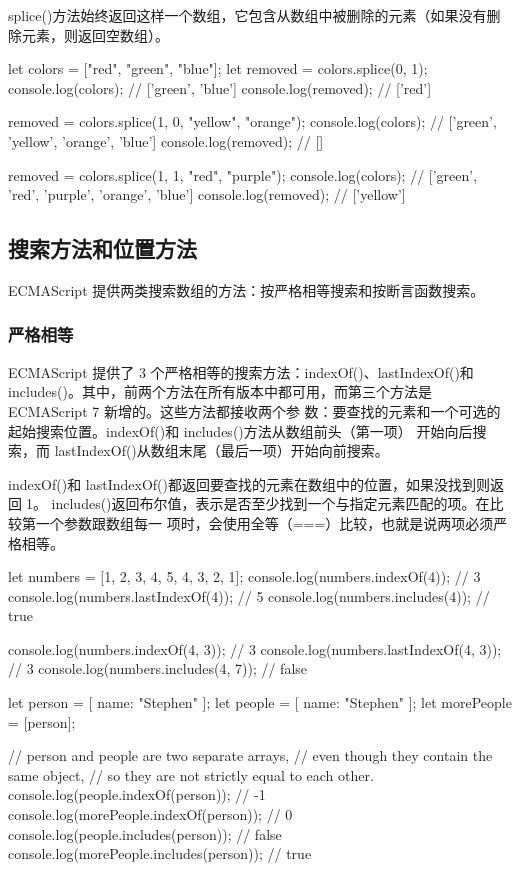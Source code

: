 splice()方法始终返回这样一个数组，它包含从数组中被删除的元素（如果没有删除元素，则返回空数组）。

\begin{js}
    let colors = ["red", "green", "blue"];
    let removed = colors.splice(0, 1);
    console.log(colors); // ['green', 'blue']
    console.log(removed); // ['red']

    removed = colors.splice(1, 0, "yellow", "orange");
    console.log(colors); // ['green', 'yellow', 'orange', 'blue']
    console.log(removed); // []

    removed = colors.splice(1, 1, "red", "purple");
    console.log(colors); // ['green', 'red', 'purple', 'orange', 'blue']
    console.log(removed); // ['yellow']
\end{js}

\subsection{搜索方法和位置方法}
ECMAScript 提供两类搜索数组的方法：按严格相等搜索和按断言函数搜索。
\subsubsection{严格相等}
ECMAScript 提供了 3 个严格相等的搜索方法：indexOf()、lastIndexOf()和 includes()。其中，前两个方法在所有版本中都可用，而第三个方法是 ECMAScript 7 新增的。这些方法都接收两个参
数：要查找的元素和一个可选的起始搜索位置。indexOf()和 includes()方法从数组前头（第一项）
开始向后搜索，而 lastIndexOf()从数组末尾（最后一项）开始向前搜索。

indexOf()和 lastIndexOf()都返回要查找的元素在数组中的位置，如果没找到则返回1。
includes()返回布尔值，表示是否至少找到一个与指定元素匹配的项。在比较第一个参数跟数组每一
项时，会使用全等（===）比较，也就是说两项必须严格相等。

\begin{js}
    let numbers = [1, 2, 3, 4, 5, 4, 3, 2, 1];
    console.log(numbers.indexOf(4)); // 3
    console.log(numbers.lastIndexOf(4)); // 5
    console.log(numbers.includes(4)); // true

    console.log(numbers.indexOf(4, 3)); // 3
    console.log(numbers.lastIndexOf(4, 3)); // 3
    console.log(numbers.includes(4, 7)); // false

    let person = [{ name: "Stephen" }];
    let people = [{ name: "Stephen" }];
    let morePeople = [person];

    // person and people are two separate arrays,
    // even though they contain the same object,
    // so they are not strictly equal to each other.
    console.log(people.indexOf(person)); // -1
    console.log(morePeople.indexOf(person)); // 0
    console.log(people.includes(person)); // false
    console.log(morePeople.includes(person)); // true
\end{js}

